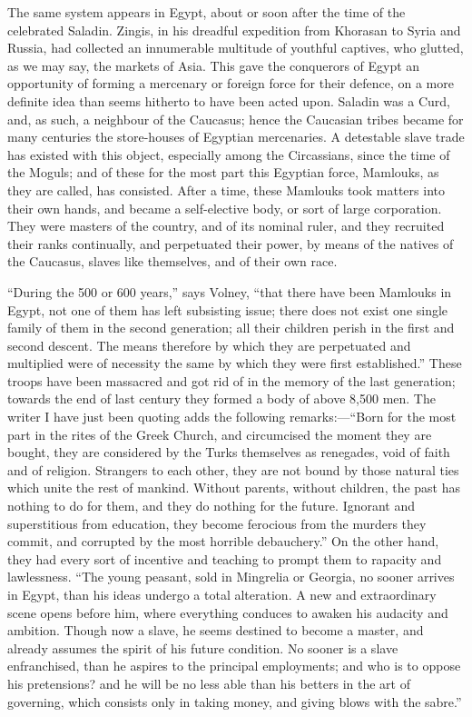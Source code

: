The same system appears in
Egypt, about or soon after the time of the celebrated Saladin. Zingis,
in his dreadful expedition from Khorasan to Syria and Russia, had
collected an innumerable multitude of youthful captives, who glutted,
as we may say, the markets of Asia. This gave the conquerors of Egypt
an opportunity of forming a mercenary or foreign force for their
defence, on a more definite idea than seems hitherto to have been
acted upon. Saladin was a Curd, and, as such, a neighbour of the
Caucasus; hence the Caucasian tribes became for many centuries the
store-houses of Egyptian mercenaries. A detestable slave trade has
existed with this object, especially among the Circassians, since the
time of the Moguls; and of these for the most part this Egyptian
force, Mamlouks, as they are called, has consisted. After a time,
these Mamlouks took matters into their own hands, and became a
self-elective body, or sort of large corporation. They were masters of
the country, and of its nominal ruler, and they recruited their ranks
continually, and perpetuated their power, by means of the natives of
the Caucasus, slaves like themselves, and of their own race.

``During
the 500 or 600 years,'' says Volney, ``that there have been Mamlouks in
Egypt, not one of them has left subsisting issue; there does not exist
one single family of them in the second generation; all their children
perish in the first and second descent. The means therefore by which
they are perpetuated and multiplied were of necessity the same by
which they were first established.'' These troops have been massacred
and got rid of in the memory of the last generation; towards the end
of last century they formed a body of above 8,500 men. The writer I
have just been quoting adds the following remarks:—``Born for the
most part in the rites of the Greek Church, and circumcised the moment
they are bought, they are considered by the Turks themselves as
renegades, void of faith and of religion. Strangers to each other,
they are not bound by those natural ties which unite the rest of
mankind. Without parents, without children, the past has nothing to do
for them, and they do nothing for the future. Ignorant and
superstitious from education, they become ferocious from the murders
they commit, and corrupted by the most horrible debauchery.'' On
the other hand, they had every sort of incentive and teaching to
prompt them to rapacity and lawlessness. ``The young peasant, sold in
Mingrelia or Georgia, no sooner arrives in Egypt, than his ideas
undergo a total alteration. A new and extraordinary scene opens before
him, where everything conduces to awaken his audacity and ambition.
Though now a slave, he seems destined to become a master, and already
assumes the spirit of his future condition. No sooner is a slave
enfranchised, than he aspires to the principal employments; and who is
to oppose his pretensions? and he will be no less able than his
betters in the art of governing, which consists only in taking money,
and giving blows with the sabre.''

